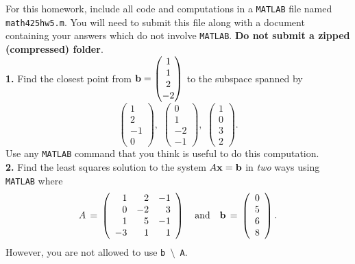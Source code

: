 \documentclass[11pt]{amsart}
\theoremstyle{definition}  %
\begin{document}


\noindent For this homework, include all code and computations in a {\tt MATLAB} file named {\tt math425hw5.m}.
You will need to submit this file along with a document containing your answers which do not
involve {\tt MATLAB}. {\bf Do not submit a zipped (compressed) folder}. \\

\noindent
{\bf 1.} Find the closest point from ${\bf b} = \begin{pmatrix} 1 \\ 1 \\ 2 \\-2 \end{pmatrix}$ to the subspace spanned by 
$$\begin{pmatrix} 1 \\ 2 \\ -1 \\0 \end{pmatrix},  \,\, \begin{pmatrix} 0 \\ 1 \\ -2 \\ -1 \end{pmatrix}, \,\,  \begin{pmatrix} 1 \\ 0 \\ 3 \\ 2 \end{pmatrix}.$$
Use any {\tt MATLAB} command that you think is useful to do this computation. \\

\noindent
{\bf 2.}  Find the least squares solution to the system $A {\bf x} = {\bf b}$  in {\it two} ways using {\tt MATLAB} where \\
$$ A \, = \, \left( \begin{array}{rrr} 1 & 2 & -1 \\ 0 & -2 & 3 \\ 1 & 5 & -1 \\ -3 & 1 & 1 \end{array} \right) \quad \mbox{and} \quad
{\bf b} \, = \, \left( \begin{array}{c} 0 \\ 5 \\ 6 \\ 8 \end{array} \right).$$
However, you are not allowed to use {\tt b $\setminus$  A}.  \\
\end{document}
